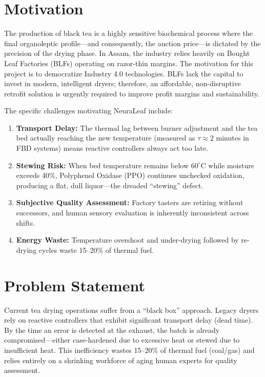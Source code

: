﻿\documentclass[12pt, a4paper]{report}
\begin{document}
\section{Motivation}
The production of black tea is a highly sensitive biochemical process where the final organoleptic profile---and consequently, the auction price---is dictated by the precision of the drying phase. In Assam, the industry relies heavily on Bought Leaf Factories (BLFs) operating on razor-thin margins. The motivation for this project is to democratize Industry 4.0 technologies. BLFs lack the capital to invest in modern, intelligent dryers; therefore, an affordable, non-disruptive retrofit solution is urgently required to improve profit margins and sustainability.

The specific challenges motivating NeuraLeaf include:
\begin{enumerate}
    \item \textbf{Transport Delay:} The thermal lag between burner adjustment and the tea bed actually reaching the new temperature (measured as $\tau \approx 2$ minutes in FBD systems) means reactive controllers always act too late.
    \item \textbf{Stewing Risk:} When bed temperature remains below $60^\circ$C while moisture exceeds 40\%, Polyphenol Oxidase (PPO) continues unchecked oxidation, producing a flat, dull liquor---the dreaded ``stewing'' defect.
    \item \textbf{Subjective Quality Assessment:} Factory tasters are retiring without successors, and human sensory evaluation is inherently inconsistent across shifts.
    \item \textbf{Energy Waste:} Temperature overshoot and under-drying followed by re-drying cycles waste 15--20\% of thermal fuel.
\end{enumerate}

\section{Problem Statement}
Current tea drying operations suffer from a ``black box'' approach. Legacy dryers rely on reactive controllers that exhibit significant transport delay (dead time). By the time an error is detected at the exhaust, the batch is already compromised---either case-hardened due to excessive heat or stewed due to insufficient heat. This inefficiency wastes 15--20\% of thermal fuel (coal/gas) and relies entirely on a shrinking workforce of aging human experts for quality assessment.
\end{document}
